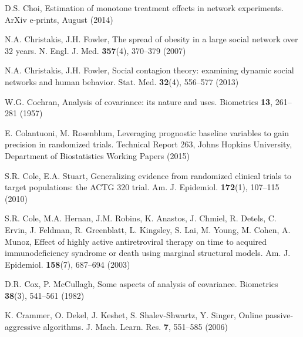 \begin{list}{}{\setlength{\leftmargin}{2.1em}\setlength{\labelwidth}{0pt}
  \setlength{\labelsep}{0pt}\setlength{\itemindent}{-2.1em}
  \setlength{\parsep}{0pt}\setlength{\itemsep}{2pt}\setlength{\topsep}{0pt}}
\item\label{refentry:REF069}D.S. Choi, Estimation of monotone treatment effects in network experiments. ArXiv e-prints, August (2014)\label{refend:REF069}
\item\label{refentry:REF070}N.A. Christakis, J.H. Fowler, The spread of obesity in a large social network over 32 years. N. Engl. J. Med. \textbf{357}(4), 370--379 (2007)\label{refend:REF070}
\item\label{refentry:REF071}N.A. Christakis, J.H. Fowler, Social contagion theory: examining dynamic social networks and human behavior. Stat. Med. \textbf{32}(4), 556--577 (2013)\label{refend:REF071}
\item\label{refentry:REF072}W.G. Cochran, Analysis of covariance: its nature and uses. Biometrics \textbf{13}, 261--281 (1957)\label{refend:REF072}
\item\label{refentry:REF073}E. Colantuoni, M. Rosenblum, Leveraging prognostic baseline variables to gain precision in randomized trials. Technical Report 263, Johns Hopkins University, Department of Biostatistics Working Papers (2015)\label{refend:REF073}
\item\label{refentry:REF074}S.R. Cole, E.A. Stuart, Generalizing evidence from randomized clinical trials to target populations: the ACTG 320 trial. Am. J. Epidemiol. \textbf{172}(1), 107--115 (2010)\label{refend:REF074}
\item\label{refentry:REF075}S.R. Cole, M.A. Hernan, J.M. Robins, K. Anastos, J. Chmiel, R. Detels, C. Ervin, J. Feldman, R. Greenblatt, L. Kingsley, S. Lai, M. Young, M. Cohen, A. Munoz, Effect of highly active antiretroviral therapy on time to acquired immunodeficiency syndrome or death using marginal structural models. Am. J. Epidemiol. \textbf{158}(7), 687--694 (2003)\label{refend:REF075}
\item\label{refentry:REF076}D.R. Cox, P. McCullagh, Some aspects of analysis of covariance. Biometrics \textbf{38}(3), 541--561 (1982)\label{refend:REF076}
\item\label{refentry:REF077}K. Crammer, O. Dekel, J. Keshet, S. Shalev-Shwartz, Y. Singer, Online passive-aggressive algorithms. J. Mach. Learn. Res. \textbf{7}, 551--585 (2006)\label{refend:REF077}

\end{list}
